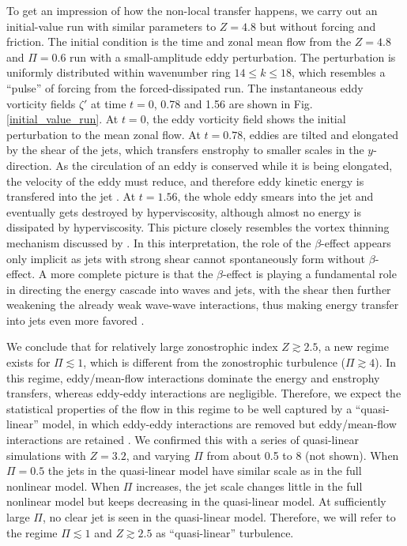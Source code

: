 \documentclass{jfm}
\begin{document}
To get an impression of how the non-local transfer happens, we carry
out an initial-value run with similar parameters to $Z=4.8$ but without
forcing and friction. The initial condition is the time and zonal mean
flow from the $Z=4.8$ and $\Pi=0.6$ run with a small-amplitude eddy
perturbation. The perturbation is uniformly distributed within
wavenumber ring $14\leq k\leq18$, which resembles a ``pulse'' of
forcing from the forced-dissipated run. The instantaneous eddy vorticity fields $\zeta'$ at
time $t=0$, 0.78 and 1.56 are shown in Fig. \ref{initial_value_run}.
At $t=0$, the eddy vorticity field shows the initial perturbation to the
mean zonal flow. At $t=0.78$, eddies are tilted and elongated by the shear
of the jets, which transfers enstrophy to smaller scales in the
$y$-direction. As the circulation of an eddy is conserved while it
is being elongated, the velocity of the eddy must reduce, and therefore
eddy kinetic energy is transfered into the jet \citep{Kraichnan1976}.
At $t=1.56$, the whole eddy smears into the jet and eventually
gets destroyed by hyperviscosity, although almost no energy is dissipated
by hyperviscosity. This picture closely resembles the vortex thinning
mechanism discussed by \citet{Manz2009}. In this interpretation,
the role of the $\beta$-effect appears only implicit as jets with strong shear
cannot spontaneously form without $\beta$-effect. A more complete 
picture is that the $\beta$-effect is playing a fundamental role in 
directing the energy cascade into waves and jets, with the shear
then further weakening the already 
weak wave-wave interactions, thus making energy transfer into 
jets even more favored \citep{Gurcan2012}.

We conclude that for relatively large zonostrophic index $Z\apprge2.5$,
a new regime exists for $\Pi\apprle1$, which is different from the
zonostrophic turbulence ($\Pi\apprge4$). In this regime, eddy/mean-flow
interactions dominate the energy and enstrophy transfers, whereas eddy-eddy
interactions are negligible. Therefore, we expect the statistical
properties of the flow in this regime to be well captured by a ``quasi-linear''
model, in which eddy-eddy interactions are removed but eddy/mean-flow
interactions are retained \citep{O'Gorman2007,Farrell2007,Srinivasan2012,Tobias2013}. 
We confirmed this 
with a series of quasi-linear simulations with $Z=3.2$, and varying $\Pi$
from about 0.5 to 8 (not shown). When $\Pi=0.5$ the jets in the
quasi-linear model have similar scale as in the full nonlinear
model. When $\Pi$ increases, the jet scale changes little in the
full nonlinear model but keeps decreasing in the quasi-linear model.
At sufficiently large $\Pi$, no clear jet is seen in the quasi-linear
model. Therefore, we will refer to the regime $\Pi\apprle1$ and $Z\apprge2.5$
as ``quasi-linear'' turbulence.
\end{document}
